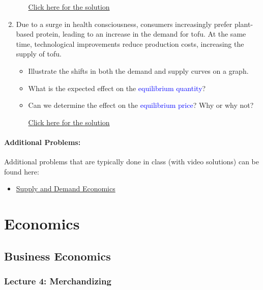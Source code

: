 \documentclass[
]{book}
\providecommand{\tightlist}{%
  \setlength{\itemsep}{0pt}\setlength{\parskip}{0pt}}
\begin{document}
\begin{enumerate}
\begin{itemize}
    \href{https://youtu.be/ChjAjdemwR4}{Click here for the solution}
  \end{itemize}
\item
  Due to a surge in health consciousness, consumers increasingly prefer plant-based protein, leading to an increase in the demand for tofu. At the same time, technological improvements reduce production costs, increasing the supply of tofu.

  \begin{itemize}
  \tightlist
  \item
    Illustrate the shifts in both the demand and supply curves on a graph.
  \item
    What is the expected effect on the \textcolor{blue}{equilibrium quantity}?
  \item
    Can we determine the effect on the \textcolor{blue}{equilibrium price}? Why or why not?

    \href{https://youtu.be/RlajAIMXlyA}{Click here for the solution}
  \end{itemize}
\end{enumerate}

\subsection*{Additional Problems:}\label{additional-problems-2}

Additional problems that are typically done in class (with video solutions) can be found here:

\begin{itemize}
\tightlist
\item
  \href{https://theelementsmath.github.io/M114/introduction-to-microeconomics.html\#supply-and-demand-economics}{Supply and Demand Economics}
\end{itemize}

\part{Economics}\label{part-economics-1}

\chapter{Business Economics}\label{business-economics}

\section*{Lecture 4: Merchandizing}\label{lecture-4-merchandizing}
\end{document}
